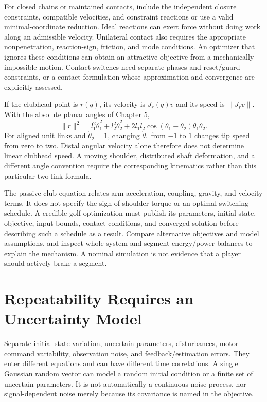 For closed chains or maintained contacts, include the independent closure
constraints, compatible velocities, and constraint reactions or use a valid
minimal-coordinate reduction. Ideal reactions can exert force without doing
work along an admissible velocity. Unilateral contact also requires the
appropriate nonpenetration, reaction-sign, friction, and mode conditions.
An optimizer that ignores these conditions can obtain an attractive objective
from a mechanically impossible motion. Contact switches need separate phases
and reset/guard constraints, or a contact formulation whose approximation
and convergence are explicitly assessed.

If the clubhead point is $r(q)$, its velocity is $J_r(q)v$ and its speed is
$\|J_rv\|$. With the absolute planar angles of Chapter 5,
\begin{equation}\label{eq:ocp_clubhead_speed}
 \|\dot r\|^2=l_1^2\dot\theta_1^2+l_2^2\dot\theta_2^2
 +2l_1l_2\cos(\theta_1-\theta_2)\dot\theta_1\dot\theta_2.
\end{equation}
For aligned unit links and $\dot\theta_2=1$, changing $\dot\theta_1$ from
$-1$ to $1$ changes tip speed from zero to two. Distal angular velocity
alone therefore does not determine linear clubhead speed. A moving shoulder,
distributed shaft deformation, and a different angle convention require the
corresponding kinematics rather than this particular two-link formula.

The passive club equation relates arm acceleration, coupling, gravity, and
velocity terms. It does not specify the sign of shoulder torque or an
optimal switching schedule. A credible golf optimization must publish its
parameters, initial state, objective, input bounds, contact conditions, and
converged solution before describing such a schedule as a result. Compare
alternative objectives and model assumptions, and inspect whole-system
and segment energy/power balances to explain the mechanism. A nominal
simulation is not evidence that a player should actively brake a segment.

\section{Repeatability Requires an Uncertainty Model}

Separate initial-state variation, uncertain parameters, disturbances, motor
command variability, observation noise, and feedback/estimation errors.
They enter different equations and can have different time correlations.
A single Gaussian random vector can model a random initial condition or a
finite set of uncertain parameters. It is not automatically a continuous
noise process, nor signal-dependent noise merely because its covariance is
named in the objective.

